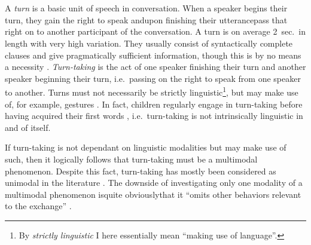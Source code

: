 
\chapter{\introduction}
\label{ch:introduction}
A \emph{turn} is a basic unit of speech in conversation. When a speaker begins their turn, they gain the right to speak and\dash upon finishing their utterance\dash pass that right on to another participant of the conversation. A turn is on average 2~sec.\ in length with very high variation. They usually consist of syntactically complete clauses and give pragmatically sufficient information, though this is by no means a necessity \citep[]{levinson16}.
\emph{Turn-taking} is the act of one speaker finishing their turn and another speaker beginning their turn, i.e.\ passing on the right to speak from one speaker to another. Turns must not necessarily be strictly linguistic\footnote{By \emph{strictly linguistic} I here essentially mean ``making use of language''.}, but may make use of, for example, gestures \citep{missingsource}. %
In fact, children regularly engage in turn-taking before having acquired their first words \citep[]{casillas16}, i.e.\ turn-taking is not intrinsically linguistic in and of itself.

If turn-taking is not dependant on linguistic modalities but may make use of such, then it logically follows that turn-taking must be a multimodal phenomenon. Despite this fact, turn-taking has mostly been considered as unimodal in the literature \citep[]{rohlfing18}. The downside of investigating only one modality of a multimodal phenomenon is\dash quite obviously\dash that it ``omits other behaviors relevant to the exchange'' \citep[]{rohlfing18}.

